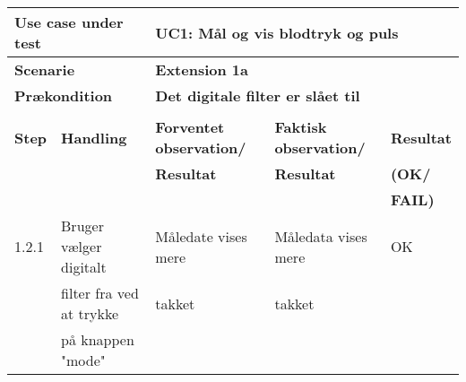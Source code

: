 \begin{table}[h!]
	\begin{tabular}{lllll}
		\multicolumn{2}{l|}{\textbf{Use case under test}} & \multicolumn{3}{l}{\textbf{UC1: Mål og vis blodtryk og puls}} \\ \hline
		\multicolumn{2}{l|}{\textbf{Scenarie}} & \multicolumn{3}{l}{\textbf{Extension 1a}} \\ \hline
		\multicolumn{2}{l|}{\textbf{Prækondition}} & \multicolumn{3}{l}{\textbf{Det digitale filter er slået til}} \\ \hline
		\multicolumn{5}{l}{\cellcolor[HTML]{187ABD}{\color[HTML]{187ABD} }} \\ \hline
		\multicolumn{1}{l|}{\textbf{Step}} & \multicolumn{1}{l|}{\textbf{Handling}} & \multicolumn{1}{l|}{\textbf{Forventet observation/}} & \multicolumn{1}{l|}{\textbf{Faktisk observation/}} & \textbf{Resultat} \\
		\multicolumn{1}{l|}{} & \multicolumn{1}{l|}{} & \multicolumn{1}{l|}{\textbf{Resultat}} & \multicolumn{1}{l|}{\textbf{Resultat}} & \textbf{(OK/} \\
		\multicolumn{1}{l|}{} & \multicolumn{1}{l|}{} & \multicolumn{1}{l|}{\textbf{}} & \multicolumn{1}{l|}{\textbf{}} & \textbf{FAIL)} \\ \hline
		\multicolumn{1}{l|}{1.2.1} & \multicolumn{1}{l|}{Bruger vælger digitalt} & \multicolumn{1}{l|}{Måledate vises mere} & \multicolumn{1}{l|}{Måledata vises mere} & OK \\
		\multicolumn{1}{l|}{} & \multicolumn{1}{l|}{filter fra ved at trykke} & \multicolumn{1}{l|}{takket} & \multicolumn{1}{l|}{takket} &  \\
		\multicolumn{1}{l|}{} & \multicolumn{1}{l|}{på knappen "mode"} & \multicolumn{1}{l|}{} & \multicolumn{1}{l|}{} & 
	\end{tabular}
\end{table}

\vspace{0.8 cm}